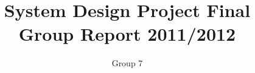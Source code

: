 \documentclass[12pt, a4paper]{article}
\begin{document}
\title{System Design Project Final Group Report 2011/2012}
\author{Group 7}

\maketitle

\begin{multicols}{2}




\end{multicols}
\end{document}

